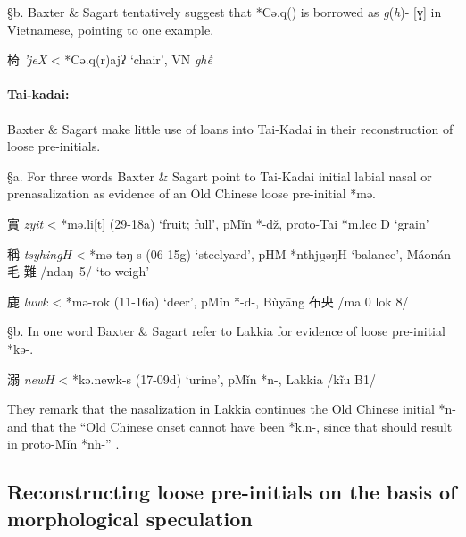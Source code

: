 §b. Baxter \& Sagart tentatively suggest that *Cə.q({}) is borrowed as
 \emph{g}(\emph{h})- {[}ɣ] in Vietnamese, pointing to one example.

\begin{description} \item
椅  \emph{'jeX} \textless{} *Cə.q(r)ajʔ `chair', VN \emph{ghế}
\end{description}

\paragraph{Tai-kadai:} Baxter \&
Sagart make little use of loans into Tai-Kadai in their reconstruction
of loose pre-initials.

§a. For three words Baxter \& Sagart point to Tai-Kadai initial labial
nasal or pre­na­sa­li­za­tion as evidence of an Old Chinese loose
pre-initial *mə.

\begin{description} \item
實 \emph{zyit} \textless{} *mə.li{[}t] (29-18a) `fruit; full', pMǐn
*-dž, proto-Tai *m.lec D `grain'
\item
稱 \emph{tsyhingH} \textless{} *mə-t{}əŋ-s (06-15g) `steelyard', pHM
*nthju̯əŋH `balance', Máonán 毛 難 /ndaŋ~5/ `to weigh'
\item
鹿 \emph{luwk} \textless{} *mə-r{}ok (11-16a) `deer', pMǐn *-d-, Bùyāng
布央 /ma 0 lok 8/
\end{description}

§b. In one word Baxter \& Sagart refer to Lakkia for evidence of loose
pre-initial *kə-.

\begin{description} \item
溺 \emph{newH} \textless{} *kə.n{}ewk-s (17-09d) `urine', pMǐn *n-,
Lakkia /kĩu B1/
\end{description}

They remark that the nasalization in Lakkia continues the Old Chinese
initial *n- and that the ``Old Chinese onset cannot have been *k.n-,
since that should result in proto-Mǐn *nh-'' 
\citeyearpar[184]{Baxter2014OldChinese}.

\subsection{Reconstructing loose pre-initials on the basis of
morphological
speculation}\label{reconstructing-loose-pre-initials-on-the-basis-of-morphological-speculation}

